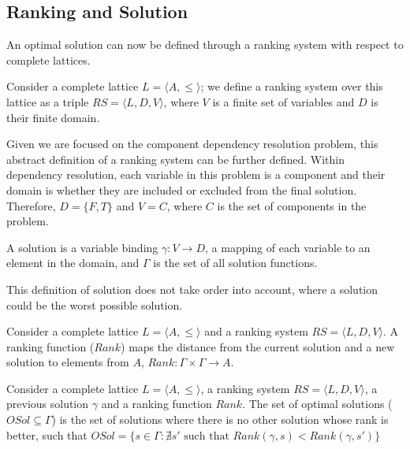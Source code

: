 \subsection{Ranking and Solution}
An optimal solution can now be defined through a ranking system with respect to complete lattices.

\begin{defs}
Consider a complete lattice $L = \langle A, \leq \rangle$; we define 
a ranking system over this lattice as a triple $RS = \langle L, D, V \rangle$, 
where $V$ is a finite set of variables and $D$ is their finite domain.
\end{defs}

Given we are focused on the component dependency resolution problem,
this abstract definition of a ranking system can be further defined.
Within dependency resolution, 
each variable in this problem is a component and their domain is whether they are included or excluded from the final solution.
Therefore, $D = \{F,T\}$ and $V = C$, where $C$ is the set of components in the problem.

\begin{defs}
A solution is a variable binding $\gamma: V \rightarrow D$, a mapping of each variable to an element in the domain,
and $\Gamma$ is the set of all solution functions.
\end{defs}

This definition of solution does not take order into account, where a solution could be the worst possible solution.

\begin{defs}
Consider a complete lattice $L = \langle A, \leq \rangle$ and a ranking system $RS = \langle L, D, V \rangle$.
A ranking function ($Rank$) maps the distance from the current solution and a new solution to elements from $A$,
$Rank: \Gamma \times \Gamma \rightarrow A$.
\end{defs}

\begin{defs}
Consider a complete lattice $L = \langle A, \leq \rangle$, a ranking system $RS = \langle L, D, V \rangle$, a previous solution $\gamma$ and a ranking function $Rank$.
The set of optimal solutions ($OSol \subseteq \Gamma$) is the set of solutions where there is no other solution whose rank is better,
such that $OSol = \{ s \in \Gamma : \nexists s' \mbox{ such that } Rank(\gamma,s) < Rank(\gamma,s')\}$
\end{defs}

